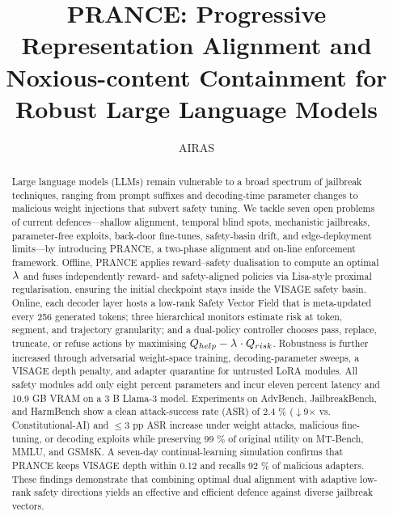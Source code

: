 \documentclass{article}
\title{PRANCE: Progressive Representation Alignment and Noxious-content Containment for Robust Large Language Models}
\author{AIRAS}
\begin{document}
\maketitle

\begin{abstract}
Large language models (LLMs) remain vulnerable to a broad spectrum of jailbreak techniques, ranging from prompt suffixes and decoding-time parameter changes to malicious weight injections that subvert safety tuning. We tackle seven open problems of current defences—shallow alignment, temporal blind spots, mechanistic jailbreaks, parameter-free exploits, back-door fine-tunes, safety-basin drift, and edge-deployment limits—by introducing PRANCE, a two-phase alignment and on-line enforcement framework. Offline, PRANCE applies reward–safety dualisation to compute an optimal $\lambda^{\*}$ and fuses independently reward- and safety-aligned policies via Lisa-style proximal regularisation, ensuring the initial checkpoint stays inside the VISAGE safety basin. Online, each decoder layer hosts a low-rank Safety Vector Field that is meta-updated every 256 generated tokens; three hierarchical monitors estimate risk at token, segment, and trajectory granularity; and a dual-policy controller chooses pass, replace, truncate, or refuse actions by maximising $Q_{help} - \lambda^{\*}\cdot Q_{risk}$. Robustness is further increased through adversarial weight-space training, decoding-parameter sweeps, a VISAGE depth penalty, and adapter quarantine for untrusted LoRA modules. All safety modules add only eight percent parameters and incur eleven percent latency and 10.9 GB VRAM on a 3 B Llama-3 model. Experiments on AdvBench, JailbreakBench, and HarmBench show a clean attack-success rate (ASR) of 2.4 \% ($\downarrow$9$\times$ vs. Constitutional-AI) and $\leq$3 pp ASR increase under weight attacks, malicious fine-tuning, or decoding exploits while preserving 99 \% of original utility on MT-Bench, MMLU, and GSM8K. A seven-day continual-learning simulation confirms that PRANCE keeps VISAGE depth within 0.12 and recalls 92 \% of malicious adapters. These findings demonstrate that combining optimal dual alignment with adaptive low-rank safety directions yields an effective and efficient defence against diverse jailbreak vectors.
\end{abstract}
\end{document}
